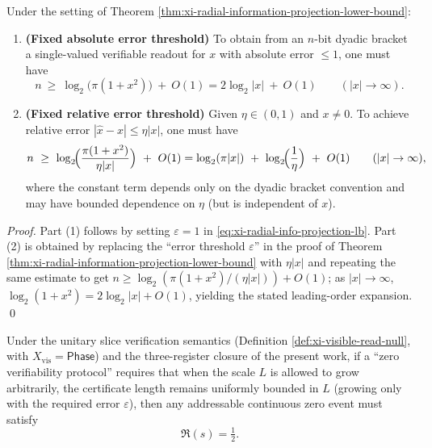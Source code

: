 \begin{corollary}\label{cor:xi-radial-info-projection-thresholds}
Under the setting of Theorem \ref{thm:xi-radial-information-projection-lower-bound}:
\begin{enumerate}
  \item \textbf{(Fixed absolute error threshold)}
  To obtain from an \(n\)-bit dyadic bracket a single-valued verifiable readout for \(x\) with absolute error \(\le 1\), one must have
  \[
  n\ \ge\ \log_2\!\bigl(\pi(1+x^2)\bigr)\ +\ O(1)
  =2\log_2|x|\ +\ O(1)\qquad(|x|\to\infty).
  \]
  \item \textbf{(Fixed relative error threshold)}
  Given \(\eta\in(0,1)\) and \(x\neq 0\).
  To achieve relative error \(|\widehat x-x|\le \eta|x|\), one must have
  \[
  n\ \ge\ \log_2\!\Bigl(\frac{\pi(1+x^2)}{\eta|x|}\Bigr)\ +\ O(1)
  =\log_2(\pi|x|)\ +\ \log_2\!\Bigl(\frac{1}{\eta}\Bigr)\ +\ O(1)\qquad(|x|\to\infty),
  \]
  where the constant term depends only on the dyadic bracket convention and may have bounded dependence on \(\eta\) (but is independent of \(x\)).
\end{enumerate}
\end{corollary}

\begin{proof}
Part (1) follows by setting \(\varepsilon=1\) in \eqref{eq:xi-radial-info-projection-lb}.
Part (2) is obtained by replacing the ``error threshold \(\varepsilon\)'' in the proof of Theorem \ref{thm:xi-radial-information-projection-lower-bound} with \(\eta|x|\) and repeating the same estimate to get
\(
n\ge \log_2(\pi(1+x^2)/(\eta|x|))+O(1)
\);
as \(|x|\to\infty\), \(\log_2(1+x^2)=2\log_2|x|+O(1)\), yielding the stated leading-order expansion. \qed
\end{proof}

\begin{corollary}[Scale consistency rigidity: \texorpdfstring{$\Re(s)=\tfrac12$}{Re(s)=1/2} as the unique low-complexity slice]\label{cor:xi-critical-line-unique-low-complexity-slice}
Under the unitary slice verification semantics (Definition \ref{def:xi-visible-read-null}, with \(X_{\mathrm{vis}}=\mathsf{Phase}\)) and the three-register closure of the present work,
if a ``zero verifiability protocol'' requires that when the scale \(L\) is allowed to grow arbitrarily, the certificate length remains uniformly bounded in \(L\) (growing only with the required error \(\varepsilon\)),
then any addressable continuous zero event must satisfy
\[
\Re(s)=\tfrac12.
\]
\end{corollary}

